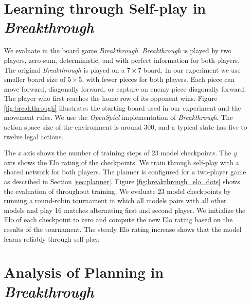 \section{Learning through Self-play in \textit{Breakthrough}} \label{sec:exp:breakthrough}


We evaluate \moozi in the board game \textit{Breakthrough}.
\textit{Breakthrough} is played by two players, zero-sum, deterministic, and with perfect information for both players.
The original \textit{Breakthrough} is played on a $7 \times 7$ board.
In our experiment we use smaller board size of \(5 \times 5\), with fewer pieces for both players.
Each piece can move forward, diagonally forward, or capture an enemy piece diagonally forward.
The player who first reaches the home row of its opponent wins.
Figure \ref{fig:breakthrough} illustrates the starting board used in our experiment and the movement rules.
We use the \textit{OpenSpiel} implementation of \textit{Breakthrough}.
The action space size of the environment is around 300, and a typical state has five to twelve legal actions.

{
    The \textit{x} axis shows the number of training steps of 23 model checkpoints.
    The \textit{y} axis shows the Elo rating of the checkpoints.
}
We train \moozi through self-play with a shared network for both players.
The planner is configured for a two-player game as described in Section \ref{sec:planner}.
Figure \ref{fig:breakthrough_elo_dots} shows the evaluation of \moozi throughout training.
We evaluate 23 model checkpoints by running a round-robin tournament in which all models pairs with all other models and play 16 matches alternating first and second player.
We initialize the Elo of each checkpoint to zero and compute the new Elo rating based on the results of the tournament.
The steady Elo rating increase shows that the model learns reliably through self-play.


\section{Analysis of Planning in \textit{Breakthrough}} \label{sec:exp:plan_breakthrough}

